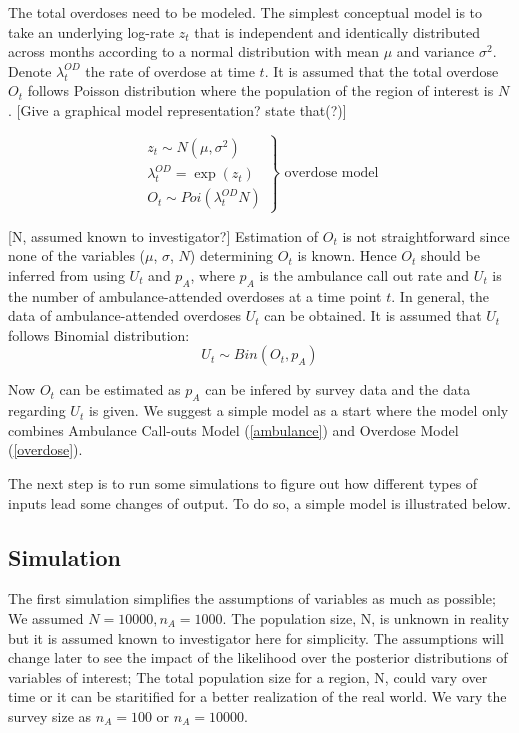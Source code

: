 \documentclass[]{article}
\begin{document}
The total overdoses need to be modeled. The simplest conceptual model is to take an underlying log-rate $z_t$ that is independent and identically distributed across months according to a normal distribution with mean $\mu$ and variance $\sigma^2$. \cite{Irvine:modelling} Denote $\lambda_{t}^{OD}$ the rate of overdose at time $t$. It is assumed that the total overdose $O_t$ follows Poisson distribution where the population of the region of interest is $N$. 
[Give a graphical model representation? state that(?)]

\begin{equation}
\label{overdose}
\left.\begin{aligned}
z_{t} \sim N(\mu, \sigma^{2}) \\
\lambda_{t}^{OD} = \exp(z_{t})\\
O_{t} \sim Poi(\lambda_{t}^{OD}N) 
\end{aligned}\right\} 
\text{		overdose model} 
\end{equation}


[N, assumed known to investigator?]
Estimation of $O_t$ is not straightforward since none of the variables ($\mu$, $\sigma$, $N$) determining $O_t$  is known. Hence $O_t$ should be inferred from using $U_t$ and \(p_A\), where $p_A$ is the ambulance call out rate and \(U_t\) is the number of  ambulance-attended overdoses at a time point $t$. In general, the data of ambulance-attended overdoses \(U_t\) can be obtained. It is assumed that  \(U_t\) follows Binomial distribution: 
\begin{equation}
\label{over_amb}
\left.
U_t \sim Bin(O_t, p_A)
\right.
\end{equation}

Now $O_t$ can be estimated as $p_A$ can be infered by survey data and the data regarding $U_t$ is given. We suggest a simple model as a start where the model only combines Ambulance Call-outs Model (\ref{ambulance}) and Overdose Model (\ref{overdose}). 

The next step is to run some simulations to figure out how different types of inputs lead some changes of output. To do so, a simple model is illustrated below.\\

\subsection{Simulation}

\normalsize 
The first simulation simplifies the assumptions of variables as much as possible; We assumed $N= 10000, n_{A}=1000$. The population size, N,  is unknown in reality but it is assumed known to investigator here for simplicity. The assumptions will change later to see the impact of the likelihood over the posterior distributions of variables of interest; The total population size for a region, N, could vary over time or it can be staritified for a better realization of the real world. We vary the survey size  as $n_{A}=100$ or $n_{A}=10000$.  \\
\end{document}

